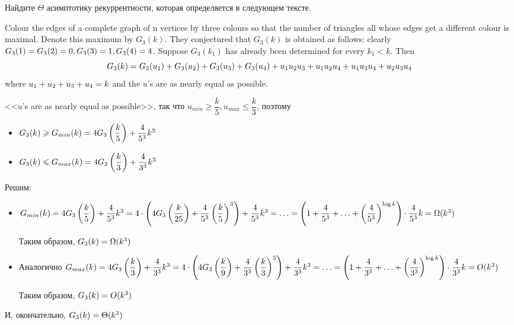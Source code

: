 \documentclass[a4paper,12pt]{article}
\begin{document}
\begin{tasknum}{3}
	Найдите $\Theta$ асимптотику рекуррентности, которая определяется в следующем тексте.
	
	Colour the edges of a
	complete graph of n vertices by three colours so that the number of triangles
	all whose edges get a different colour is maximal. Denote this maximum
	by $G_3(k)$. They conjectured that $G_3(k)$ is obtained as follows: clearly
	$G_3(1) \hm{=} G_3(2) \hm{=} 0, G_3(3) \hm{=} 1, G_3(4) \hm{=} 4$. Suppose $G_3(k_1)$ has already been
	determined for every $k_1 < k$. Then
	$$G_3(k) \hm{=} G_3(u_1) + G_3(u_2) + G_3(u_3) + G_3(u_4)
	+ u_1 u_2 u_3 + u_1 u_2 u_4 + u_1 u_3 u_4 + u_2 u_3 u_4$$
	where $u_1 + u_2 + u_3 + u_4 \hm{=} k$ and the $u$’s are as nearly equal as possible.
\end{tasknum}

\begin{solution}
	<<$u$’s are as nearly equal as possible>>, так что $u_{min} \ge \dfrac{k}{5}, u_{max} \le \dfrac{k}{3}$, поэтому 
	\begin{itemize}
		\item $G_3(k) \ge G_{min}(k) \hm{=} 4 G_3\left(\dfrac{k}{5} \right) + \dfrac{4}{5^3} k^3$ 
		\item $G_3(k) \le G_{max}(k) \hm{=} 4 G_3\left(\dfrac{k}{3} \right) + \dfrac{4}{3^3} k^3$ 
	\end{itemize}

	Решим:
	
	\begin{itemize}
		\item $G_{min}(k) \hm{=} 4 G_3\left(\dfrac{k}{5} \right) + \dfrac{4}{5^3} k^3 \hm{=} 4 \cdot \left(4 G_3\left(\dfrac{k}{25} \right) + \dfrac{4}{5^3} \left(\dfrac{k}{5} \right) ^3 \right) + \dfrac{4}{5^3} k^3 \hm{=} \ldots \hm{=} \left(1 + \dfrac{4}{5^3} + \ldots + \left( \dfrac{4}{5^3}\right) ^{\log k}\right) \cdot \dfrac{4}{5^3} k \hm{=} \Omega(k^3)$
	
	Таким образом, $G_3(k) \hm{=} \Omega(k^3)$
	
		\item Аналогично $G_{max}(k) \hm{=} 4 G_3\left(\dfrac{k}{3} \right) + \dfrac{4}{3^3} k^3 \hm{=} 4 \cdot \left(4 G_3\left(\dfrac{k}{9} \right) + \dfrac{4}{3^3} \left(\dfrac{k}{3} \right) ^3 \right) + \dfrac{4}{3^3} k^3 \hm{=} \ldots \hm{=} \left(1 + \dfrac{4}{3^3} + \ldots + \left( \dfrac{4}{3^3}\right) ^{\log k}\right) \cdot \dfrac{4}{3^3} k \hm{=} O(k^3)$
	
	Таким образом, $G_3(k) \hm{=} O(k^3)$
	
\end{itemize}
	
	И, окончательно, $G_3(k) \hm{=} \Theta(k^3)$
	
\end{solution}
\end{document}
